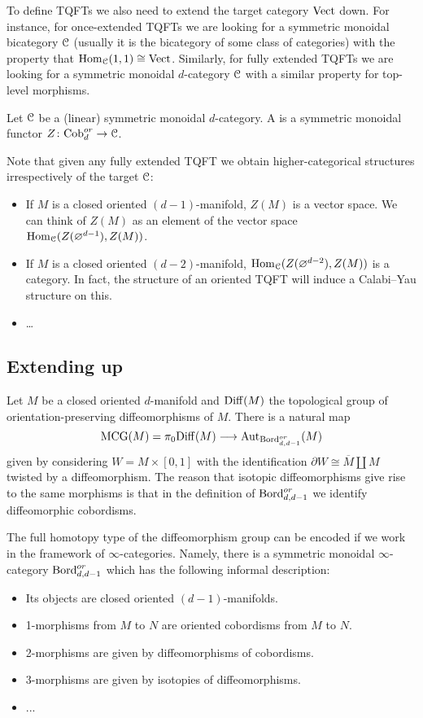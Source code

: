 To define TQFTs we also need to extend the target category $\mathrm{Vect}$ down. For instance, for once-extended TQFTs we are looking for a symmetric monoidal bicategory $\mathcal{C}$ (usually it is the bicategory of some class of categories) with the property that $\mathrm{Hom}_{\mathcal{C}}(1, 1)\cong \mathrm{Vect}$. Similarly, for fully extended TQFTs we are looking for a symmetric monoidal $d$-category $\mathcal{C}$ with a similar property for top-level morphisms.

\begin{defn}
	Let $\mathcal{C}$ be a (linear) symmetric monoidal $d$-category. A  is a symmetric monoidal functor $Z\colon \mathrm{Cob}^{or}_d\rightarrow \mathcal{C}$.
\end{defn}

Note that given any fully extended TQFT we obtain higher-categorical structures irrespectively of the target $\mathcal{C}$:
\begin{itemize}
	\item If $M$ is a closed oriented $(d-1)$-manifold, $Z(M)$ is a vector space. We can think of $Z(M)$ as an element of the vector space $\mathrm{Hom}_{\mathcal{C}}(Z(\varnothing^{d-1}), Z(M))$.
	
	\item If $M$ is a closed oriented $(d-2)$-manifold, $\mathrm{Hom}_{\mathcal{C}}(Z(\varnothing^{d-2}), Z(M))$ is a category. In fact, the structure of an oriented TQFT will induce a Calabi--Yau structure on this.
	\item \dots
\end{itemize}

\subsection{Extending up}

Let $M$ be a closed oriented $d$-manifold and $\mathrm{Diff}(M)$ the topological group of orientation-preserving diffeomorphisms of $M$. There is a natural map
\[\mathrm{MCG}(M) = \pi_0\mathrm{Diff}(M)\longrightarrow \mathrm{Aut}_{\mathrm{Bord}^{or}_{d, d-1}}(M)\]
given by considering $W=M\times [0, 1]$ with the identification $\partial W\cong \overline{M}\coprod M$ twisted by a diffeomorphism. The reason that isotopic diffeomorphisms give rise to the same morphisms is that in the definition of $\mathrm{Bord}^{or}_{d, d-1}$ we identify diffeomorphic cobordisms.

The full homotopy type of the diffeomorphism group can be encoded if we work in the framework of $\infty$-categories. Namely, there is a symmetric monoidal $\infty$-category $\mathrm{Bord}^{or}_{d, d-1}$ which has the following informal description:
\begin{itemize}
	\item Its objects are closed oriented $(d-1)$-manifolds.
	\item 1-morphisms from $M$ to $N$ are oriented cobordisms from $M$ to $N$.
	\item 2-morphisms are given by diffeomorphisms of cobordisms.
	\item 3-morphisms are given by isotopies of diffeomorphisms.
	\item ...
\end{itemize}

